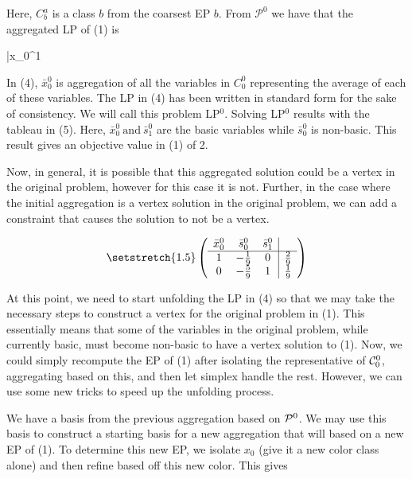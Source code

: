 \documentclass[11pt]{article} %
\newcommand{\cP}{{\cal P}}
\newcommand{\cC}{{\cal C}}
\begin{document}
	 Here, $C_b^a$ is a class $b$ from the coarsest EP $b$.  From $\mathcal{P}^0$ we have that the aggregated LP of (1) is  
 
 \begin{mini!}
 	{}{\bar{x}_0^1}{}{}
 \end{mini!}

	In (4), $\bar{x}_0^0$ is aggregation of all the variables in $C_0^0$ representing the average of each of these variables.  The LP in (4) has been written in standard form for the sake of consistency. We will call this problem LP$^0$. Solving LP$^0$ results with the tableau in (5).  Here, $\bar{x}_0^0 \ \text{and} \ \bar{s}_1^0$ are the basic variables while $\bar{s}_0^0$ is non-basic.  This result gives an objective value in (1) of 2.
	
	Now, in general, it is possible that this aggregated solution could be a vertex in the original problem, however for this case it is not.  Further, in the case where the initial aggregation is a vertex solution in the original problem, we can add a constraint that causes the solution to not be a vertex.
	
	\begin{equation}\setstretch{1.5}
	\begin{pmatrix}
	\begin{array}{ccc|c}
		\bar{x}_0^0 & \bar{s}_0^0 & \bar{s}_1^0 \\
		\hline
		1 & -\frac{1}{9} & 0 & \frac{2}{9} \\
		0 & -\frac{5}{9} & 1 & \frac{1}{9} 
	\end{array}
	\end{pmatrix}
	\end{equation}
	
	At this point, we need to start unfolding the LP in (4) so that we may take the necessary steps to construct a vertex for the original problem in (1).  This essentially means that some of the variables in the original problem, while currently basic, must become non-basic to have a vertex solution to (1).  Now, we could simply recompute the EP of (1) after isolating the representative of $\cC_0^0$, aggregating based on this, and then let simplex handle the rest.  However, we can use some new tricks to speed up the unfolding process.
	
	We have a basis from the previous aggregation based on $\cP^0$.  We  may use this basis to construct a starting basis for a new aggregation that will based on a new EP of (1).  To determine this new EP, we isolate $x_0$ (give it a new color class alone) and then refine based off this new color.  This gives
	
\end{document}
